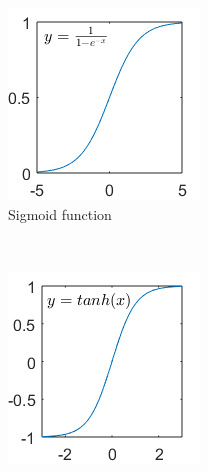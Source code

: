 \documentclass[a4paper,11pt]{article}
\begin{document}
\begin{figure}
        \centering
        \begin{subfigure}[b]{0.3\textwidth}
                \includegraphics[width=\textwidth]{sigmoid.png}
                \caption{Sigmoid function}
                \label{fig:sigmoid}
        \end{subfigure}
        ~ %
        \begin{subfigure}[b]{0.3\textwidth}
                \includegraphics[width=\textwidth]{tanh.png}

\end{subfigure}
\end{figure}
\end{document}

